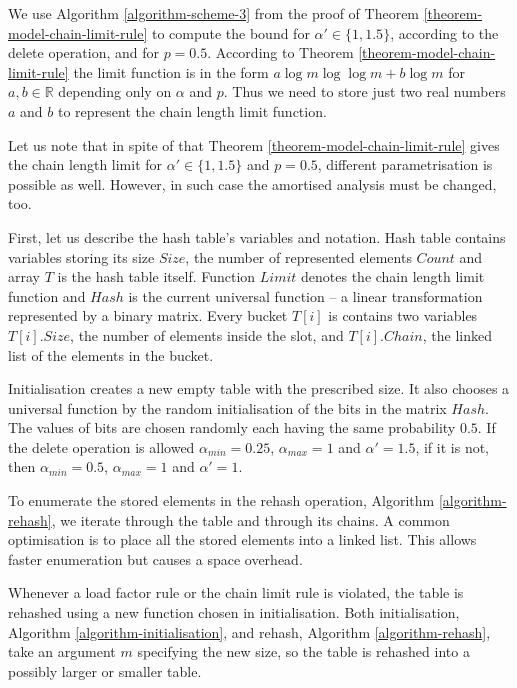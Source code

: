 We use Algorithm \ref{algorithm-scheme-3} from the proof of Theorem \ref{theorem-model-chain-limit-rule} to compute the bound for $\alpha' \in \{1, 1.5\}$, according to the delete operation, and for $p = 0.5$. According to Theorem \ref{theorem-model-chain-limit-rule} the limit function is in the form $a \log m \log \log m + b \log m$ for $a, b \in \mathbb{R}$ depending only on $\alpha$ and $p$. Thus we need to store just two real numbers $a$ and $b$ to represent the chain length limit function.

Let us note that in spite of that Theorem \ref{theorem-model-chain-limit-rule} gives the chain length limit for $\alpha' \in \{1, 1.5\}$ and $p = 0.5$, different parametrisation is possible as well. However, in such case the amortised analysis must be changed, too. 

First, let us describe the hash table's variables and notation. Hash table contains variables storing its size $Size$, the number of represented elements $Count$ and array $T$ is the hash table itself. Function $Limit$ denotes the chain length limit function and $Hash$ is the current universal function -- a linear transformation represented by a binary matrix. Every bucket $T[i]$ is contains two variables $T[i].Size$, the number of elements inside the slot, and $T[i].Chain$, the linked list of the elements in the bucket.

Initialisation creates a new empty table with the prescribed size. It also chooses a universal function by the random initialisation of the bits in the matrix $Hash$. The values of bits are chosen randomly each having the same probability $0.5$. If the delete operation is allowed $\alpha_{min} = 0.25$, $\alpha_{max} = 1$ and $\alpha' = 1.5$, if it is not, then $\alpha_{min} = 0.5$, $\alpha_{max} = {1}$ and $\alpha' = 1$.



To enumerate the stored elements in the rehash operation, Algorithm \ref{algorithm-rehash}, we iterate through the table and through its chains. A common optimisation is to place all the stored elements into a linked list. This allows faster enumeration but causes a space overhead.

Whenever a load factor rule or the chain limit rule is violated, the table is rehashed using a new function chosen in initialisation. Both initialisation, Algorithm \ref{algorithm-initialisation}, and rehash, Algorithm \ref{algorithm-rehash}, take an argument $m$ specifying the new size, so the table is rehashed into a possibly larger or smaller table.

